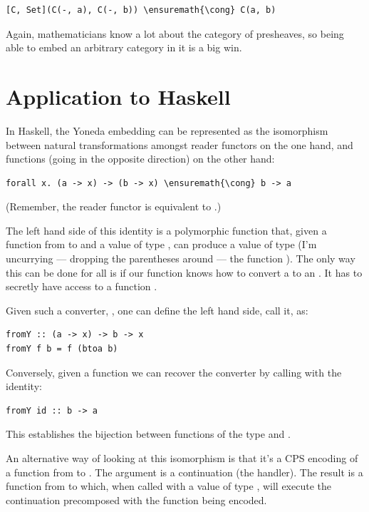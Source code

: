\begin{Verbatim}[commandchars=\\\{\}]
[C, Set](C(-, a), C(-, b)) \ensuremath{\cong} C(a, b)
\end{Verbatim}
Again, mathematicians know a lot about the category of presheaves, so
being able to embed an arbitrary category in it is a big win.

\section{Application to Haskell}\label{application-to-haskell}

In Haskell, the Yoneda embedding can be represented as the isomorphism
between natural transformations amongst reader functors on the one hand,
and functions (going in the opposite direction) on the other hand:

\begin{Verbatim}[commandchars=\\\{\}]
forall x. (a -> x) -> (b -> x) \ensuremath{\cong} b -> a
\end{Verbatim}
(Remember, the reader functor is equivalent to
.)

The left hand side of this identity is a polymorphic function that,
given a function from  to  and a value of type
, can produce a value of type  (I'm uncurrying ---
dropping the parentheses around --- the function
). The only way this can be done for all
 is if our function knows how to convert a  to an
. It has to secretly have access to a function
.

Given such a converter, , one can define the left hand
side, call it, as:

\begin{Verbatim}[commandchars=\\\{\}]
fromY :: (a -> x) -> b -> x
fromY f b = f (btoa b)
\end{Verbatim}
Conversely, given a function  we can recover the converter
by calling  with the identity:

\begin{Verbatim}[commandchars=\\\{\}]
fromY id :: b -> a
\end{Verbatim}
This establishes the bijection between functions of the type
 and .

An alternative way of looking at this isomorphism is that it's a CPS
encoding of a function from  to . The argument
 is a continuation (the handler). The result
is a function from  to  which, when called with a
value of type , will execute the continuation precomposed with
the function being encoded.

